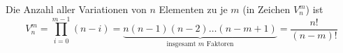 \documentclass{article}
\begin{document}
\noindent
Die Anzahl aller Variationen von $n$ Elementen
zu je $m$ (in Zeichen $V_n^m$) ist
\vspace{-0.5ex}
\[ V_n^m = \prod_{i=0}^{m-1}(n-i) = 
  \underbrace{n(n-1)(n-2)\ldots(n-m+1)}_{\mbox{insgesamt $m$ Faktoren}} =
  \frac{n!}{(n-m)!} \]
\end{document}
